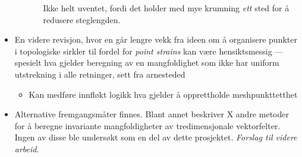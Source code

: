 \begin{framed}
\begin{itemize}
\begin{itemize}
\begin{itemize}
                            Ikke helt uventet, fordi det holder med mye
                            krumning \emph{ett} sted for å redusere
                            steglengden.
                    \end{itemize}
            \end{itemize}
            \item En videre revisjon, hvor en går lengre vekk fra ideen om å
                organisere punkter i topologiske sirkler til fordel for
                \emph{point strains} kan være hensiktsmessig --- spesielt hva
                gjelder beregning av en mangfoldighet som ikke har uniform
                utstrekning i alle retninger, sett fra arnesteded
                \begin{itemize}
                    \item Kan medføre innfløkt logikk hva gjelder å
                        opprettholde meshpunkttetthet
                \end{itemize}
                \item Alternative fremgangsmåter finnes. Blant annet beskriver
                    \textcite{krauskopf2005survey} X andre metoder for å
                    beregne invariante mangfoldigheter av tredimensjonale
                    vektorfelter. Ingen av disse ble undersøkt som en del av
                    dette prosjektet. \emph{Forslag til videre arbeid}.
    \end{itemize}
\end{framed}

